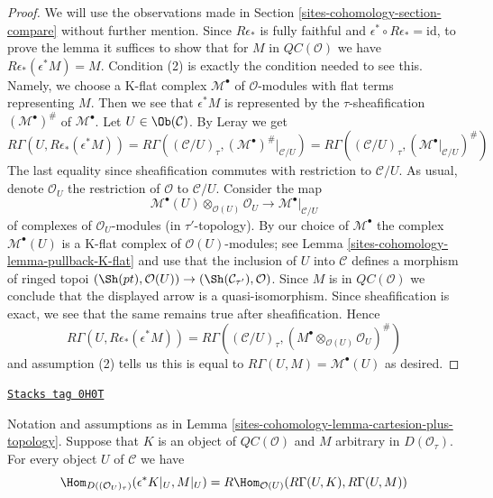 \begin{proof}
We will use the observations made in Section \ref{sites-cohomology-section-compare} without
further mention. Since $R\epsilon_*$
is fully faithful and $\epsilon^* \circ R\epsilon_* = \text{id}$,
to prove the lemma it suffices to show that for $M$ in
$\mathit{QC}(\mathcal{O})$ we have $R\epsilon_*(\epsilon^*M) = M$.
Condition (2) is exactly the condition needed to see this.
Namely, we choose a K-flat complex $\mathcal{M}^\bullet$
of $\mathcal{O}$-modules with flat terms representing $M$.
Then we see that $\epsilon^*M$ is represented by the $\tau$-sheafification
$(\mathcal{M}^\bullet)^\#$ of $\mathcal{M}^\bullet$.
Let $U \in \Ob(\mathcal{C})$. By Leray we get
$$
R\Gamma(U, R\epsilon_*(\epsilon^*M)) =
R\Gamma((\mathcal{C}/U)_\tau, (\mathcal{M}^\bullet)^\#|_{\mathcal{C}/U}) =
R\Gamma((\mathcal{C}/U)_\tau, (\mathcal{M}^\bullet|_{\mathcal{C}/U})^\#)
$$
The last equality since
sheafification commutes with restriction to $\mathcal{C}/U$.
As usual, denote $\mathcal{O}_U$ the restriction of $\mathcal{O}$ to
$\mathcal{C}/U$. Consider the map
$$
\mathcal{M}^\bullet(U) \otimes_{\mathcal{O}(U)} \mathcal{O}_U
\longrightarrow
\mathcal{M}^\bullet|_{\mathcal{C}/U}
$$
of complexes of $\mathcal{O}_U$-modules (in $\tau'$-topology).
By our choice of $\mathcal{M}^\bullet$ the complex $\mathcal{M}^\bullet(U)$
is a K-flat complex of $\mathcal{O}(U)$-modules; see
Lemma \ref{sites-cohomology-lemma-pullback-K-flat} and use that the inclusion
of $U$ into $\mathcal{C}$ defines a morphism of ringed topoi
$(\Sh(pt), \mathcal{O}(U)) \to (\Sh(\mathcal{C}_{\tau'}), \mathcal{O})$.
Since $M$ is in $\mathit{QC}(\mathcal{O})$ we conclude that
the displayed arrow is a quasi-isomorphism. Since sheafification
is exact, we see that the same remains true after sheafification.
Hence
$$
R\Gamma(U, R\epsilon_*(\epsilon^*M)) =
R\Gamma((\mathcal{C}/U)_\tau,
(M^\bullet \otimes_{\mathcal{O}(U)} \mathcal{O}_U)^\#)
$$
and assumption (2) tells us this is equal to
$R\Gamma(U, M) = \mathcal{M}^\bullet(U)$ as desired.
\end{proof}

\begin{lemma}
\label{sites-cohomology-lemma-QC-hom-out-of-plus-topology}
\href{https://stacks.math.columbia.edu/tag/0H0T}{\texttt{Stacks tag 0H0T}}

Notation and assumptions as in Lemma \ref{sites-cohomology-lemma-cartesion-plus-topology}.
Suppose that $K$ is an object of
$\mathit{QC}(\mathcal{O})$ and $M$ arbitrary in $D(\mathcal{O}_\tau)$.
For every object $U$ of $\mathcal{C}$ we have
$$
\Hom_{D((\mathcal{O}_U)_\tau)}(\epsilon^*K|_U, M|_U) =
R\Hom_{\mathcal{O}(U)}(R\Gamma(U, K), R\Gamma(U, M))
$$
\end{lemma}

